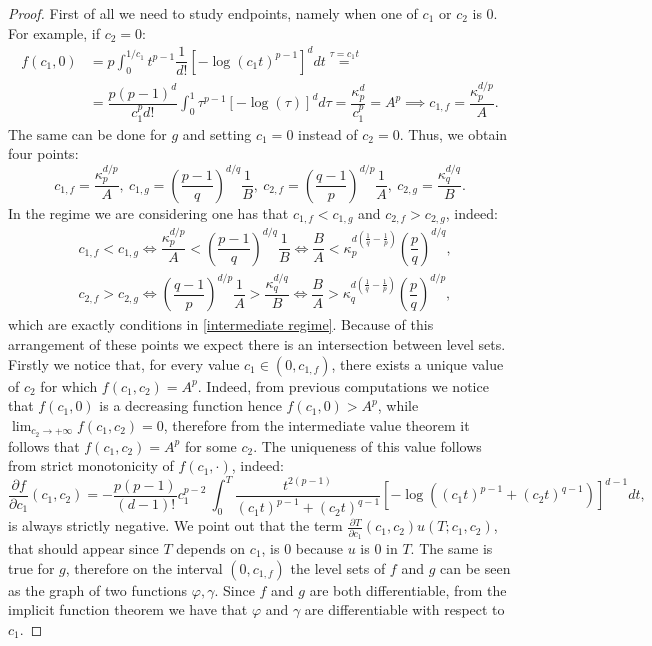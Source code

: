 \documentclass[corpo=11pt, stile=classica, tipotesi=custom,
greek, evenboxes, english]{toptesi}
\numberwithin{equation}{chapter}
\theoremstyle{definition}
\theoremstyle{remark}
\newcommand{\pfrac}[2]{\frac{\partial #1}{\partial #2}}
\begin{document}
\begin{proof}
First of all we need to study endpoints, namely when one of $c_1$ or $c_2$ is 0. For example, if $c_2=0$:
\begin{align*}
	f(c_1,0) &= p\int_0^{1/{c_1}} t^{p-1}\dfrac{1}{d!}\left[-\log(c_1t)^{p-1}\right]^d dt \overset{\tau = c_1t}{=} \\
			 &= \dfrac{p(p-1)^d}{c_1^p d!}\int_0^1 \tau^{p-1}\left[-\log(\tau)\right]^d d\tau = \dfrac{\kappa_p^d}{c_1^p} = A^p \implies c_{1,f} = \dfrac{\kappa_p^{d/p}}{A}.
\end{align*}
The same can be done for $g$ and setting $c_1=0$ instead of $c_2 = 0$. Thus, we obtain four points:
\begin{equation*}
	c_{1,f} = \dfrac{\kappa_p^{d/p}}{A},\ c_{1,g} = \left(\dfrac{p-1}{q}\right)^{d/q}\dfrac1{B},\ c_{2,f} = \left(\dfrac{q-1}{p}\right)^{d/p}\dfrac1{A},\ c_{2,g} = \dfrac{\kappa_q^{d/q}}{B}.
\end{equation*}
In the regime we are considering one has that $c_{1,f} < c_{1,g}$ and $c_{2,f} > c_{2,g}$, indeed:
\begin{align*}
	&c_{1,f} < c_{1,g} \iff \dfrac{\kappa_p^{d/p}}{A} < \left(\dfrac{p-1}{q}\right)^{d/q}\dfrac1{B} \iff \dfrac{B}{A} < \kappa_p^{d\left( \frac1{q}-\frac1{p}\right)}\left(\dfrac{p}{q}\right)^{d/q},\\
	&c_{2,f} > c_{2,g} \iff \left(\dfrac{q-1}{p}\right)^{d/p}\dfrac1{A} > \dfrac{\kappa_q^{d/q}}{B} \iff \dfrac{B}{A} > \kappa_q^{d\left( \frac1{q}-\frac1{p}\right)}\left(\dfrac{p}{q}\right)^{d/p},
\end{align*}
which are exactly conditions in \eqref{intermediate regime}.
Because of this arrangement of these points we expect there is an intersection between level sets. Firstly we notice that, for every value $c_1 \in (0,c_{1,f})$, there exists a unique value of $c_2$ for which $f(c_1,c_2) = A^p$. Indeed, from previous computations we notice that $f(c_1,0)$ is a decreasing function hence $f(c_1,0) > A^p$, while $\lim_{c_2 \rightarrow +\infty} f(c_1,c_2) = 0$, therefore from the intermediate value theorem it follows that $f(c_1,c_2) = A^p$ for some $c_2$. The uniqueness of this value follows from strict monotonicity of $f(c_1,\cdot)$, indeed:
\begin{equation}\label{df/dc1}
	\pfrac{f}{c_1}(c_1,c_2) = -\dfrac{p(p-1)}{(d-1)!}c_1^{p-2}\ \int_0^T \dfrac{t^{2(p-1)}}{(c_1t)^{p-1}+(c_2t)^{q-1}} \left[ -\log\left((c_1t)^{p-1} + (c_2t)^{q-1}\right) \right]^{d-1}dt,
\end{equation}
is always strictly negative. We point out that the term $\frac{\partial T}{\partial c_1}(c_1,c_2)u(T;c_1,c_2)$, that should appear since $T$ depends on $c_1$, is 0 because $u$ is 0 in $T$. The same is true for $g$, therefore on the interval $(0,c_{1,f})$ the level sets of $f$ and $g$ can be seen as the graph of two functions $\varphi, \gamma$. Since $f$ and $g$ are both differentiable, from the implicit function theorem we have that $\varphi$ and  $\gamma$ are differentiable with respect to $c_1$.


\end{proof}
\end{document}

